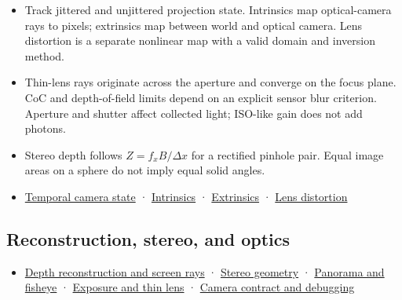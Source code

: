 \begin{itemize}
\tightlist
\item
  Track jittered and unjittered projection state. Intrinsics map optical-camera rays to pixels; extrinsics map between world and optical camera. Lens distortion is a separate nonlinear map with a valid domain and inversion method.
\item
  Thin-lens rays originate across the aperture and converge on the focus plane. CoC and depth-of-field limits depend on an explicit sensor blur criterion. Aperture and shutter affect collected light; ISO-like gain does not add photons.
\item
  Stereo depth follows \(Z=f_xB/\Delta x\) for a rectified pinhole pair. Equal image areas on a sphere do not imply equal solid angles.
\item
  \href{Continuous\%20Notes/Computing\%20Foundations\%20-\%20From\%20Bits\%20to\%20C++\%20and\%20Systems\%20APIs\#A\%20camera\%20image\%20changes\%20over\%20time}{Temporal camera state} · \href{Continuous\%20Notes/Computing\%20Foundations\%20-\%20From\%20Bits\%20to\%20C++\%20and\%20Systems\%20APIs\#Intrinsics\%20map\%20optical\%20rays\%20to\%20pixels}{Intrinsics} · \href{Continuous\%20Notes/Computing\%20Foundations\%20-\%20From\%20Bits\%20to\%20C++\%20and\%20Systems\%20APIs\#Extrinsics\%20place\%20the\%20optical\%20camera\%20in\%20the\%20world}{Extrinsics} · \href{Continuous\%20Notes/Computing\%20Foundations\%20-\%20From\%20Bits\%20to\%20C++\%20and\%20Systems\%20APIs\#Real\%20lenses\%20bend\%20the\%20pinhole\%20image}{Lens distortion}
\end{itemize}

\subsection{Reconstruction, stereo, and optics}\label{reconstruction-stereo-and-optics}

\begin{itemize}
\tightlist
\item
  \href{Continuous\%20Notes/Computing\%20Foundations\%20-\%20From\%20Bits\%20to\%20C++\%20and\%20Systems\%20APIs\#Recover\%20geometry\%20from\%20depth\%20and\%20construct\%20screen-space\%20rays}{Depth reconstruction and screen rays} · \href{Continuous\%20Notes/Computing\%20Foundations\%20-\%20From\%20Bits\%20to\%20C++\%20and\%20Systems\%20APIs\#Build\%20projection\%20and\%20stereo\%20geometry\%20around\%20real\%20camera\%20baselines}{Stereo geometry} · \href{Continuous\%20Notes/Computing\%20Foundations\%20-\%20From\%20Bits\%20to\%20C++\%20and\%20Systems\%20APIs\#Represent\%20directions\%20over\%20the\%20full\%20sphere}{Panorama and fisheye} · \href{Continuous\%20Notes/Computing\%20Foundations\%20-\%20From\%20Bits\%20to\%20C++\%20and\%20Systems\%20APIs\#Model\%20exposure,\%20physical\%20optics,\%20and\%20depth\%20of\%20field}{Exposure and thin lens} · \href{Continuous\%20Notes/Computing\%20Foundations\%20-\%20From\%20Bits\%20to\%20C++\%20and\%20Systems\%20APIs\#Make\%20camera\%20conventions\%20explicit\%20and\%20debug\%20the\%20full\%20transform\%20chain}{Camera contract and debugging}
\end{itemize}

